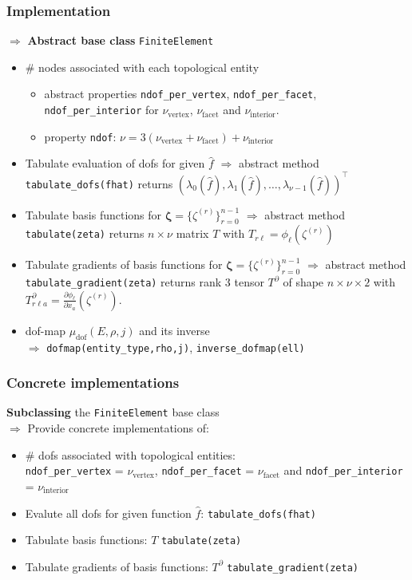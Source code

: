 \documentclass{beamer}
\begin{document}

\begin{frame}
\frametitle{Implementation}
$\Rightarrow$
\textbf{Abstract base class} \lstinline{FiniteElement}
\begin{itemize}
\item \# nodes associated with each topological entity
\begin{itemize}
  \item abstract properties \lstinline{ndof_per_vertex}, \lstinline{ndof_per_facet}, \lstinline{ndof_per_interior} for $\nu_{\text{vertex}}$, $\nu_{\text{facet}}$ and $\nu_{\text{interior}}$. 
  \item property \lstinline{ndof}: $\nu =3(\nu_{\text{vertex}}+\nu_{\text{facet}})+\nu_{\text{interior}}$
\end{itemize}
\item Tabulate evaluation of dofs for given $\hat{f}$ $\Rightarrow$ abstract method \lstinline{tabulate_dofs(fhat)} returns $(\lambda_0(\hat{f}),\lambda_1(\hat{f}),\dots,\lambda_{\nu-1}(\hat{f}))^\top$
\item Tabulate basis functions for $\boldsymbol{\zeta}=\{\zeta^{(r)}\}_{r=0}^{n-1}$ $\Rightarrow$ abstract method \lstinline{tabulate(zeta)} returns $n\times\nu$ matrix $T$ with $T_{r\ell}=\phi_\ell(\zeta^{(r)})$ 
\item Tabulate gradients of basis functions for $\boldsymbol{\zeta}=\{\zeta^{(r)}\}_{r=0}^{n-1}$ $\Rightarrow$ abstract method \lstinline{tabulate_gradient(zeta)} returns rank 3 tensor $T^\partial$ of shape $n\times\nu\times 2$ with $T^\partial_{r\ell a}=\frac{\partial\phi_\ell}{\partial x_a}(\zeta^{(r)})$. 
\item dof-map $\mu_{\text{dof}}(E,\rho,j)$ and its inverse\\$\Rightarrow$ \lstinline{dofmap(entity_type,rho,j)}, \lstinline{inverse_dofmap(ell)}
\end{itemize}
\end{frame}


\begin{frame}
\frametitle{Concrete implementations}
\textbf{Subclassing} the \lstinline{FiniteElement} base class\\
$\Rightarrow$ Provide concrete implementations of:
\begin{itemize}
\item \# dofs associated with topological entities:\\\lstinline{ndof_per_vertex} = $\nu_{\text{vertex}}$, \lstinline{ndof_per_facet} = $\nu_{\text{facet}}$ and \lstinline{ndof_per_interior} = $\nu_{\text{interior}}$
\item Evalute all dofs for given function $\widehat{f}$: \lstinline{tabulate_dofs(fhat)} 
\item Tabulate basis functions: $T$ \lstinline{tabulate(zeta)}
\item Tabulate gradients of basis functions: $T^\partial$ \lstinline{tabulate_gradient(zeta)}
\end{itemize}
\end{frame}
\end{document}
